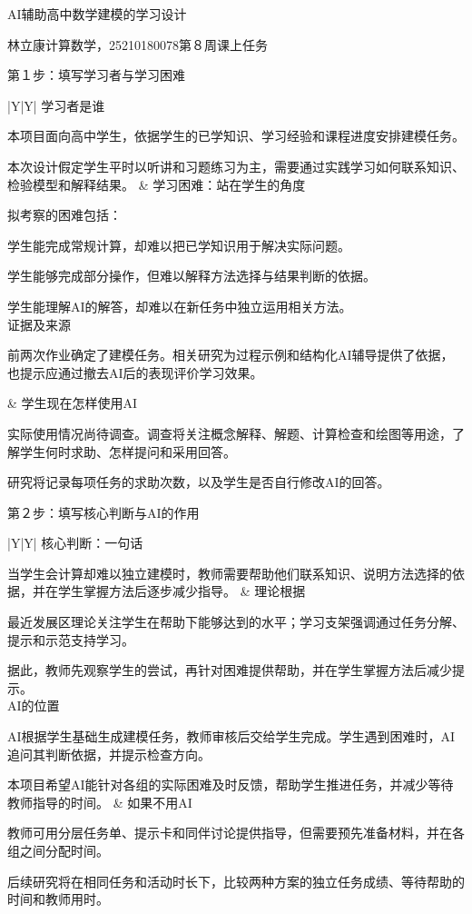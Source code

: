\documentclass[UTF8,a4paper,11pt,fontset=windows]{ctexart}
\newcommand{\step}[1]{\par\addvspace{5pt}
  {\sffamily\fontsize{13pt}{18pt}\selectfont #1}\par\nobreak\vspace{7pt}}
\newcommand{\celltitle}[1]{\vspace{3pt}
  {\sffamily\fontsize{11pt}{16pt}\selectfont #1}\par\vspace{5pt}}
\newcommand{\cellpara}{\par\vspace{5pt}}
\begin{document}
\begin{center}
{\sffamily\fontsize{15pt}{21pt}\selectfont AI辅助高中数学建模的学习设计}\par
\vspace{3pt}
{\fontsize{9.5pt}{14pt}\selectfont 林立康\quad 计算数学，25210180078\quad 第８周课上任务}
\end{center}

\step{第１步：填写学习者与学习困难}
\begin{tabularx}{\textwidth}{|Y|Y|}
\hline
\celltitle{学习者是谁}
本项目面向高中学生，依据学生的已学知识、学习经验和课程进度安排建模任务。
\cellpara
本次设计假定学生平时以听讲和习题练习为主，需要通过实践学习如何联系知识、检验模型和解释结果。
&
\celltitle{学习困难：站在学生的角度}
拟考察的困难包括：
\cellpara
学生能完成常规计算，却难以把已学知识用于解决实际问题。
\cellpara
学生能够完成部分操作，但难以解释方法选择与结果判断的依据。
\cellpara
学生能理解AI的解答，却难以在新任务中独立运用相关方法。
\\[8pt]\hline
\celltitle{证据及来源}
前两次作业确定了建模任务。相关研究为过程示例和结构化AI辅导提供了依据\cite{hanze2022,kestin2025}，也提示应通过撤去AI后的表现评价学习效果\cite{bastani2025}。
\cellpara
&
\celltitle{学生现在怎样使用AI}
实际使用情况尚待调查。调查将关注概念解释、解题、计算检查和绘图等用途，了解学生何时求助、怎样提问和采用回答。
\cellpara
研究将记录每项任务的求助次数，以及学生是否自行修改AI的回答。
\\[8pt]\hline
\end{tabularx}

\newpage
\step{第２步：填写核心判断与AI的作用}
\begin{tabularx}{\textwidth}{|Y|Y|}
\hline
\celltitle{核心判断：一句话}
当学生会计算却难以独立建模时，教师需要帮助他们联系知识、说明方法选择的依据，并在学生掌握方法后逐步减少指导。
&
\celltitle{理论根据}
最近发展区理论关注学生在帮助下能够达到的水平\cite{vygotsky1978}；学习支架强调通过任务分解、提示和示范支持学习\cite{wood1976}。
\cellpara
据此，教师先观察学生的尝试，再针对困难提供帮助，并在学生掌握方法后减少提示。
\\[8pt]\hline
\celltitle{AI的位置}
AI根据学生基础生成建模任务，教师审核后交给学生完成。学生遇到困难时，AI追问其判断依据，并提示检查方向。
\cellpara
本项目希望AI能针对各组的实际困难及时反馈，帮助学生推进任务，并减少等待教师指导的时间。
&
\celltitle{如果不用AI}
教师可用分层任务单、提示卡和同伴讨论提供指导，但需要预先准备材料，并在各组之间分配时间。
\cellpara
后续研究将在相同任务和活动时长下，比较两种方案的独立任务成绩、等待帮助的时间和教师用时。
\\[8pt]\hline
\end{tabularx}
\end{document}
